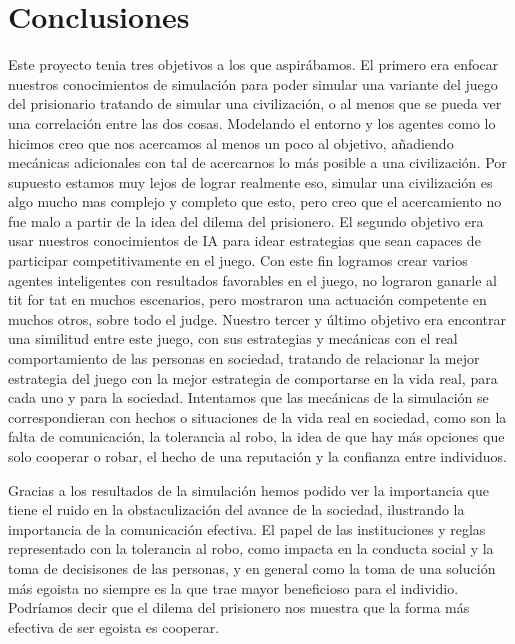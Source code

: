\documentclass{article}
\begin{document}
\section{Conclusiones}
Este proyecto tenia tres objetivos a los que aspir\'abamos. El primero era enfocar nuestros conocimientos de simulación para poder simular una variante del juego del prisionario
tratando de simular una civilización, o al menos que se pueda ver una correlaci\'on entre las dos cosas. Modelando el entorno y los agentes como lo hicimos creo que nos acercamos
al menos un poco al objetivo, a\~nadiendo mec\'anicas adicionales con tal de acercarnos lo m\'as posible  a una civilización. Por supuesto estamos muy lejos de lograr realmente eso,
simular una civilización es algo mucho mas complejo y completo que esto, pero creo que el acercamiento no fue malo a partir de la idea del dilema del prisionero. El segundo objetivo
era usar nuestros conocimientos de IA para idear estrategias que sean capaces de participar competitivamente en el juego. Con este fin logramos crear varios agentes inteligentes con
resultados favorables en el juego, no lograron ganarle al tit for tat en muchos escenarios, pero mostraron una actuaci\'on competente en muchos otros, sobre todo el judge. Nuestro tercer
y \'ultimo objetivo era encontrar una similitud entre este juego, con sus estrategias y mec\'anicas con el real comportamiento de las personas en sociedad, tratando de relacionar la mejor
estrategia del juego con la mejor estrategia de comportarse en la vida real, para cada uno y para la sociedad. Intentamos que las mec\'anicas de la simulaci\'on se correspondieran con hechos
o situaciones de la vida real en sociedad, como son la falta de comunicaci\'on, la tolerancia al robo, la idea de que hay m\'as opciones que solo cooperar o robar, el hecho de una reputaci\'on y
la confianza entre individuos.

Gracias a los resultados de la simulaci\'on hemos podido ver la importancia que tiene el ruido en la obstaculizaci\'on del avance de la sociedad, ilustrando la importancia de la comunicaci\'on
efectiva. El papel de las instituciones y reglas representado con la tolerancia al robo, como impacta en la conducta social y la toma de decisisones de las personas, y en general como la toma de una soluci\'on
m\'as egoista no siempre es la que trae mayor beneficioso para el individio. Podr\'iamos decir que el dilema del prisionero nos muestra que la forma m\'as efectiva de ser egoista es cooperar.
\end{document}
